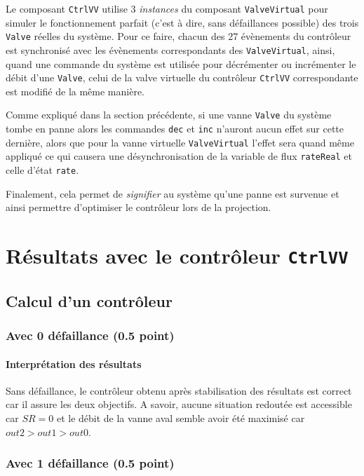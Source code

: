 \documentclass[a4paper]{book}
\begin{document}
Le composant \texttt{CtrlVV} utilise 3 \textit{instances} du composant
\texttt{ValveVirtual} pour simuler le fonctionnement parfait (c'est à dire,
sans défaillances possible) des trois \texttt{Valve} réelles du système. Pour
ce faire, chacun des 27 évènements du contrôleur est synchronisé avec les
évènements correspondants des \texttt{ValveVirtual}, ainsi, quand une commande
du système est utilisée pour décrémenter ou incrémenter le débit d'une
\texttt{Valve}, celui de la valve virtuelle du contrôleur \texttt{CtrlVV}
correspondante est modifié de la même manière.

Comme expliqué dans la section précédente, si une vanne \texttt{Valve} du
système tombe en panne alors les commandes \texttt{dec} et \texttt{inc}
n'auront aucun effet sur cette dernière, alors que pour la vanne virtuelle
\texttt{ValveVirtual} l'effet sera quand même appliqué ce qui causera une
désynchronisation de la variable de flux \texttt{rateReal} et celle d'état
\texttt{rate}.

Finalement, cela permet de \textit{signifier} au système qu'une panne est
survenue et ainsi permettre d'optimiser le contrôleur lors de la projection.

\section{Résultats avec le contrôleur {\tt CtrlVV}}
\subsection{Calcul d'un contrôleur}
\subsubsection{Avec 0 défaillance (0.5 point)}

\paragraph{Interprétation des résultats}

Sans défaillance, le contrôleur obtenu après stabilisation des résultats est
correct car il assure les deux objectifs. A savoir, aucune situation redoutée
est accessible car $SR = 0$ et le débit de la vanne aval semble avoir été
maximisé car $out2 > out1 > out0$.

\subsubsection{Avec 1 défaillance (0.5 point)}

\end{document}
